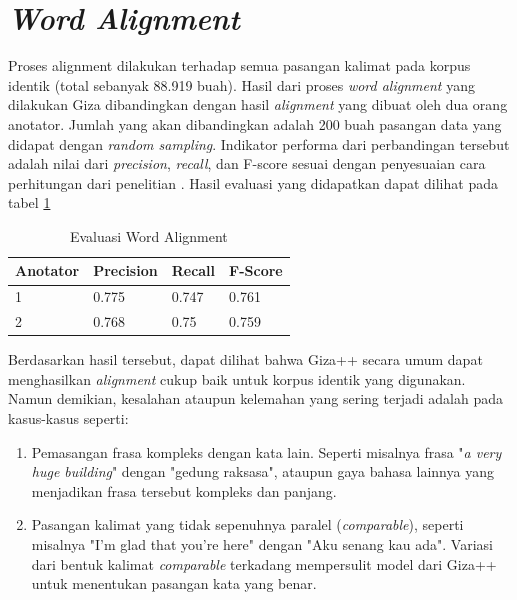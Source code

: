 \section{\textit{Word Alignment}}

Proses alignment dilakukan terhadap semua pasangan kalimat pada korpus identik (total sebanyak 88.919 buah). Hasil dari proses \textit{word alignment} yang dilakukan Giza dibandingkan dengan hasil \textit{alignment} yang dibuat oleh dua orang anotator. Jumlah yang akan dibandingkan adalah 200 buah pasangan data yang didapat dengan \textit{random sampling}. Indikator performa dari perbandingan tersebut adalah nilai dari \textit{precision}, \textit{recall}, dan F-score sesuai dengan penyesuaian cara perhitungan dari penelitian \citep{mihalcea2003evaluation}. Hasil evaluasi yang didapatkan dapat dilihat pada tabel \ref{table:word-alignment-evaluation}

\begin{table}
	\centering
	\caption{Evaluasi Word Alignment}
	\label{table:word-alignment-evaluation}
	\begin{tabular}{|p{2cm}|p{2cm}|p{2cm}|p{2cm}|}
		\hline
		Anotator & Precision & Recall & F-Score
		\\ \hline
		1 & 0.775 & 0.747 & 0.761
		\\ \hline
		2 & 0.768 & 0.75 & 0.759
		\\ \hline
	\end{tabular} 
\end{table}

Berdasarkan hasil tersebut, dapat dilihat bahwa Giza++ secara umum dapat menghasilkan \textit{alignment} cukup baik untuk korpus identik yang digunakan. Namun demikian, kesalahan ataupun kelemahan yang sering terjadi adalah pada kasus-kasus seperti:

\begin{enumerate}
	\item Pemasangan frasa kompleks dengan kata lain. Seperti misalnya frasa "\textit{a very huge building}" dengan "gedung raksasa", ataupun gaya bahasa lainnya yang menjadikan frasa tersebut kompleks dan panjang.
	\item Pasangan kalimat yang tidak sepenuhnya paralel (\textit{comparable}), seperti misalnya "I'm glad that you're here" dengan "Aku senang kau ada". Variasi dari bentuk kalimat \textit{comparable} terkadang mempersulit model dari Giza++ untuk menentukan pasangan kata yang benar.
\end{enumerate}

